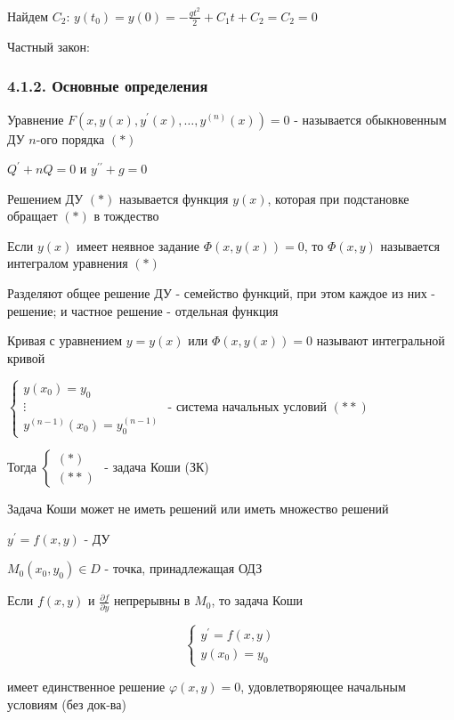 \documentclass[12pt]{article}
\begin{document}
    Найдем $C_2$: $y(t_0) = y(0) = -\frac{gt^2}{2} + C_1 t + C_2 = C_2 = 0$

    Частный закон: 

    \subsubsection{4.1.2. Основные определения}

    \hypertarget{differentialequationdefinition}{}

     Уравнение $F(x, y(x), y^\prime(x), \dots, y^{(n)}(x)) = 0$ - называется обыкновенным ДУ $n$-ого порядка $(*)$

    \Exs $Q^\prime + nQ = 0$ и $y^{\prime\prime} + g = 0$

     Решением ДУ $(*)$ называется функция $y(x)$, которая при подстановке обращает $(*)$ в тождество

     Если $y(x)$ имеет неявное задание $\Phi(x, y(x)) = 0$, то $\Phi(x, y)$ называется интегралом уравнения $(*)$

    \Notas Разделяют общее решение ДУ - семейство функций, при этом каждое из них - решение; и
    частное решение - отдельная функция

     Кривая с уравнением $y = y(x)$ или $\Phi(x, y(x)) = 0$ называют интегральной кривой

    \hypertarget{problemCauchy}{}

     $\begin{cases}y(x_0) = y_0 \\ \vdots \\ y^{(n - 1)}(x_0) = y_0^{(n - 1)}\end{cases}$ - система начальных условий $(**)$

    Тогда $\begin{cases}(*) \\ (**)\end{cases}$ - задача Коши (ЗК)

    \Notas Задача Коши может не иметь решений или иметь множество решений

    \begin{MyTheorem}
        \Ths $y^\prime = f(x, y)$ - ДУ

        $M_0(x_0, y_0) \in D$ - точка, принадлежащая ОДЗ

        Если $f(x, y)$ и $\frac{\partial f}{\partial y}$ непрерывны в $M_0$, то задача Коши

        \[\begin{cases}y^\prime = f(x, y) \\ y(x_0) = y_0\end{cases}\]

        имеет единственное решение $\varphi(x, y) = 0$, удовлетворяющее начальным условиям (без док-ва)
    \end{MyTheorem}
\end{document}
